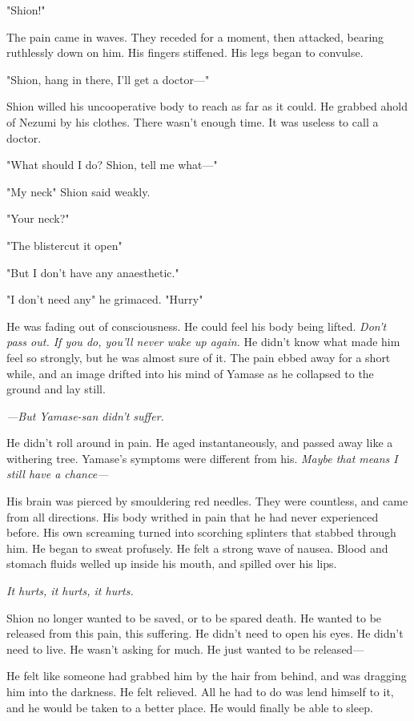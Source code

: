 "Shion!"

The pain came in waves. They receded for a moment, then attacked,
bearing ruthlessly down on him. His fingers stiffened. His legs began to
convulse.

"Shion, hang in there, I'll get a doctor---"

Shion willed his uncooperative body to reach as far as it could. He
grabbed ahold of Nezumi by his clothes. There wasn't enough time. It was
useless to call a doctor.

"What should I do? Shion, tell me what---"

"My neck\el " Shion said weakly.

"Your neck?"

"The blister\el cut it open\el "

"But I don't have any anaesthetic."

"I don't need any\el " he grimaced. "Hurry\el "

He was fading out of consciousness. He could feel his body being lifted.
\emph{Don't pass out. If you do, you'll never wake up again.} He didn't know
what made him feel so strongly, but he was almost sure of it. The pain
ebbed away for a short while, and an image drifted into his mind of
Yamase as he collapsed to the ground and lay still.

\emph{---But Yamase-san didn't suffer.}

He didn't roll around in pain. He aged instantaneously, and passed away
like a withering tree. Yamase's symptoms were different from his. \emph{Maybe
that means I still have a chance---}

His brain was pierced by smouldering red needles. They were countless,
and came from all directions. His body writhed in pain that he had never
experienced before. His own screaming turned into scorching splinters
that stabbed through him. He began to sweat profusely. He felt a strong
wave of nausea. Blood and stomach fluids welled up inside his mouth, and
spilled over his lips.

\emph{It hurts, it hurts, it hurts.}

Shion no longer wanted to be saved, or to be spared death. He wanted to
be released from this pain, this suffering. He didn't need to open his
eyes. He didn't need to live. He wasn't asking for much. He just wanted
to be released---

He felt like someone had grabbed him by the hair from behind, and was
dragging him into the darkness. He felt relieved. All he had to do was
lend himself to it, and he would be taken to a better place. He would
finally be able to sleep.

